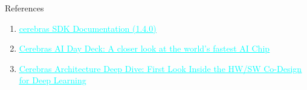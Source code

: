 \documentclass[dvipdfmx, 11pt, aspectratio=169]{beamer}   %
\newcommand{\ulhref}[2]{\href{#1}{\textcolor{cyan}{\uline{#2}}}}
\begin{document}
\begin{frame}[fragile]{References}
  \begin{enumerate}\footnotesize
    \item \ulhref{https://sdk.cerebras.net/computing-with-cerebras}{cerebras SDK Documentation (1.4.0)}
    \item \ulhref{https://www.slideshare.net/slideshow/cerebras-ai-day-deck-a-closer-look-at-the-worlds-fastest-ai-chip/266911791}{Cerebras AI Day Deck: A closer look at the world's fastest AI Chip}
    \item \ulhref{https://hc34.hotchips.org/assets/program/conference/day2/Machine\%20Learning/HC2022_Cerebras_Final_v02.pdf}{Cerebras Architecture Deep Dive: First Look Inside the HW/SW Co-Design for Deep Learning}
  \end{enumerate}
\end{frame}
\end{document}
